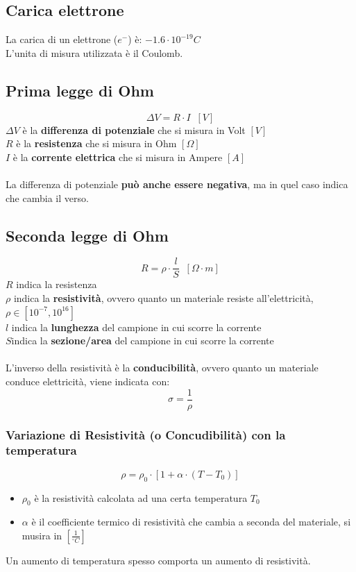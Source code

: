 \documentclass[../main.tex]{subfiles}
\begin{document}
	\subsection{Carica elettrone}
	La carica di un elettrone ($e^-$) è: $-1.6 \cdot 10^{-19} C$ \\
	L'unita di misura utilizzata è il Coulomb.
	
	\subsection{Prima legge di Ohm}
	\begin{equation}
		\Delta V = R \cdot I \;\; [V]
	\end{equation}
	$\Delta V$ è la \textbf{differenza di potenziale} che si misura in Volt $[V]$ \\
	$R$ è la \textbf{resistenza} che si misura in Ohm $[\Omega]$ \\
	$I$ è la \textbf{corrente elettrica} che si misura in Ampere $[A]$\\\\
	La differenza di potenziale \textbf{può anche essere negativa}, ma in quel caso indica che cambia il verso.
	\subsection{Seconda legge di Ohm}
	\begin{equation}
		R = \rho \cdot \frac{l}{S} \;\; [\Omega \cdot m]
	\end{equation}
	$R$ indica la resistenza \\
	$\rho$ indica la \textbf{resistività}, ovvero quanto un materiale resiste all'elettricità, $\rho \in \left[ 10^{-7}, 10^{16}\right]$ \\
	$l$ indica la \textbf{lunghezza} del campione in cui scorre la corrente \\
	$S$indica la \textbf{sezione/area} del campione in cui scorre la corrente \\ \\
	L'inverso della resistività è la \textbf{conducibilità}, ovvero quanto un materiale conduce elettricità, viene indicata con:
	\[ \sigma = \frac{1}{\rho} \]
	\subsubsection{Variazione di Resistività (o Concudibilità) con la temperatura}
	\[\rho = \rho_0 \cdot \left[ 1 + \alpha \cdot (T - T_0)\right] \]
	\begin{itemize}
		\item $\rho_0$ è la resistività calcolata ad una certa temperatura $T_0$
		\item $\alpha$ è il coefficiente termico di resistività che cambia a seconda del materiale, si musira in $\left[ \frac{1}{ ^\circ C}\right]$
	\end{itemize}
	Un aumento di temperatura spesso comporta un aumento di resistività.
\end{document}
